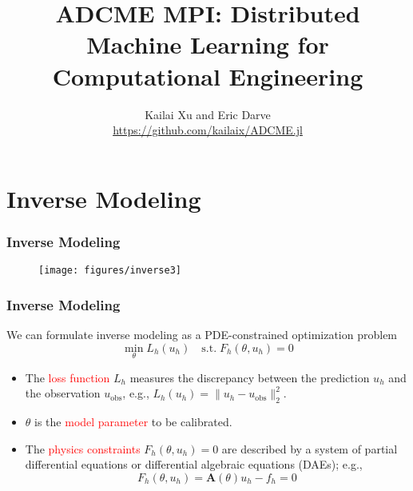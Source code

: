 \documentclass[usenames,dvipsnames]{beamer}
\title[Distributed ML for Scientific Computing]{ADCME MPI: Distributed Machine Learning for Computational Engineering} %
\author[ADCME-MPI]{Kailai Xu and Eric Darve \\ \url{https://github.com/kailaix/ADCME.jl}} %
\date{}%
\begin{document}
\begin{frame}

\titlepage %

\end{frame}
\usebackgroundtemplate{}

\section{Inverse Modeling}




\begin{frame}
	\frametitle{Inverse Modeling}
	\begin{figure}
		\centering
		\texttt{[image: figures/inverse3]}
	\end{figure}
\end{frame}



\begin{frame}
	\frametitle{Inverse Modeling}
	We can formulate inverse modeling as a PDE-constrained optimization problem 
	\begin{equation*}
		\min_{\theta} L_h(u_h) \quad \mathrm{s.t.}\; F_h(\theta, u_h) = 0
	\end{equation*}
	\begin{itemize}
		\item The \textcolor{red}{loss function} $L_h$ measures the discrepancy between the prediction $u_h$ and the observation $u_{\mathrm{obs}}$, e.g., $L_h(u_h) = \|u_h - u_{\mathrm{obs}}\|_2^2$. 
		\item $\theta$ is the \textcolor{red}{model parameter} to be calibrated. 
		\item The \textcolor{red}{physics constraints} $F_h(\theta, u_h)=0$ are described by a system of partial differential equations or differential algebraic equations (DAEs); e.g., 
		$$F_h(\theta, u_h) = \mathbf{A}(\theta) u_h - f_h = 0$$
	\end{itemize}
\end{frame}
\end{document}
